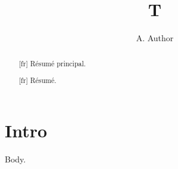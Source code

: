 \documentclass{kwmttlang}
\begin{document}
\title{T}\author{A. Author}
\maketitle
\begin{abstract}[fr]
R\'esum\'e principal.
\end{abstract}
\section{Intro}
Body.
\begin{abstract}[fr]
R\'esum\'e.
\end{abstract}
\end{document}
